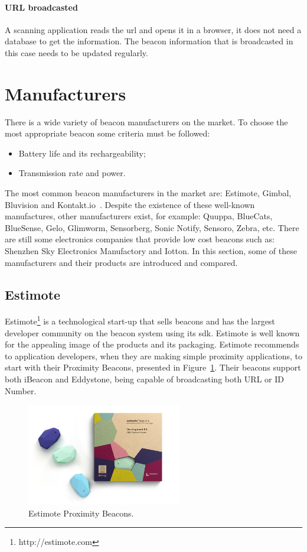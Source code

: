 \paragraph{URL broadcasted} 
\label{paragraph:urlbroadcasted}
A scanning application reads the \gls{url} and opens it in a browser, it does not need a database to get the information.
The beacon information that is broadcasted in this case needs to be updated regularly.

\section{Manufacturers}
\label{section:manufacturers}
There is a wide variety of beacon manufacturers on the market. To choose the most appropriate beacon some criteria must be followed:
\begin{itemize}
\item Battery life and its rechargeability; 

\item Transmission rate and power.

\end{itemize}
The most common beacon manufacturers in the market are: Estimote, Gimbal, Bluvision and Kontakt.io~\citep{Statler}. Despite the existence of these well-known manufactures, other manufacturers exist, for example: Quuppa, BlueCats, BlueSense, Gelo, Glimworm, Sensorberg, Sonic Notify, Sensoro, Zebra, etc. There are still some electronics companies that provide low cost beacons such as: Shenzhen Sky Electronics Manufactory and Iotton. In this section, some of these manufacturers and their products are introduced and compared.

\subsection{Estimote} 
\label{subsection:estimote}
Estimote\footnote{http://estimote.com} is a technological start-up that sells beacons and has the largest developer community on the beacon system using its \gls{sdk}. Estimote is well known for the appealing image of the products and its packaging. Estimote recommends to application developers, when they are making simple proximity applications, to start with their Proximity Beacons, presented in Figure~\ref{fig:estimotebeacon}. Their beacons support both iBeacon and Eddystone, being capable of broadcasting both URL or ID Number. 

\begin{figure}[!htb]
  \centering
  \includegraphics[width=0.6\textwidth]{Figures/estimote_data.png}
  \caption[Estimote Proximity Beacons]{Estimote Proximity Beacons.}
  \label{fig:estimotebeacon}
\end{figure}

